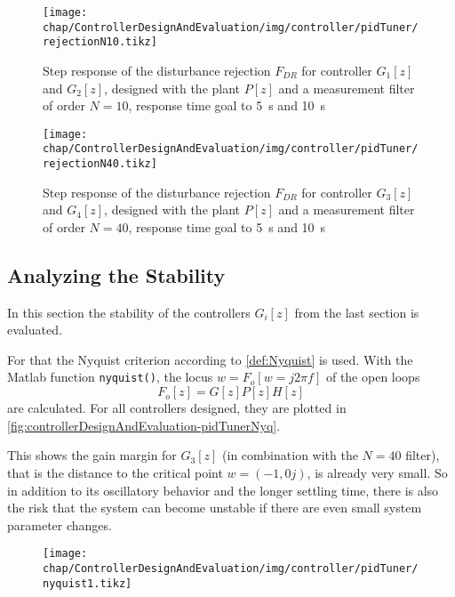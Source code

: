\begin{figure}[tb]
	\centering
	\texttt{[image: chap/ControllerDesignAndEvaluation/img/controller/pidTuner/rejectionN10.tikz]}
	\caption{Step response of the disturbance rejection $F_{DR}$ for controller $G_1[z]$ and $G_2[z]$, designed with the plant $P[z]$ and a measurement filter of order $N=10$, response time goal to \SI{5}{\second} and \SI{10}{\second}}
	\label{fig:controllerDesignAndEvaluation-pidTunerDRN10}
\end{figure}

\begin{figure}[tb]
	\centering
	\texttt{[image: chap/ControllerDesignAndEvaluation/img/controller/pidTuner/rejectionN40.tikz]}
	\caption{Step response of the disturbance rejection $F_{DR}$ for controller $G_3[z]$ and $G_4[z]$, designed with the plant $P[z]$ and a measurement filter of order $N=40$, response time goal to \SI{5}{\second} and \SI{10}{\second}}
	\label{fig:controllerDesignAndEvaluation-pidTunerDRN40}
\end{figure}


\subsection{Analyzing the Stability}
In this section the stability of the controllers $G_{i}[z]$ from the last section is evaluated.

For that the Nyquist criterion according to \autoref{def:Nyquist} is used. With the Matlab function \texttt{nyquist()}, the locus $w=F_o[w=j2\pi f]$ of the open loops
\begin{equation}
F_o[z]=G[z] P[z] H[z]
\end{equation}
are calculated. For all controllers designed, they are plotted in \autoref{fig:controllerDesignAndEvaluation-pidTunerNyq}.

This shows the gain margin for $G_3[z]$ (in combination with the $N=40$ filter), that is the distance to the critical point $w=(-1,0j)$, is already very small. So in addition to its oscillatory behavior and the longer settling time, there is also the risk that the system can become unstable if there are even small system parameter changes.

\begin{figure}[tb]
	\centering
	\texttt{[image: chap/ControllerDesignAndEvaluation/img/controller/pidTuner/nyquist1.tikz]}
	\caption{}
	\label{fig:controllerDesignAndEvaluation-pidTunerNyq}
\end{figure}


